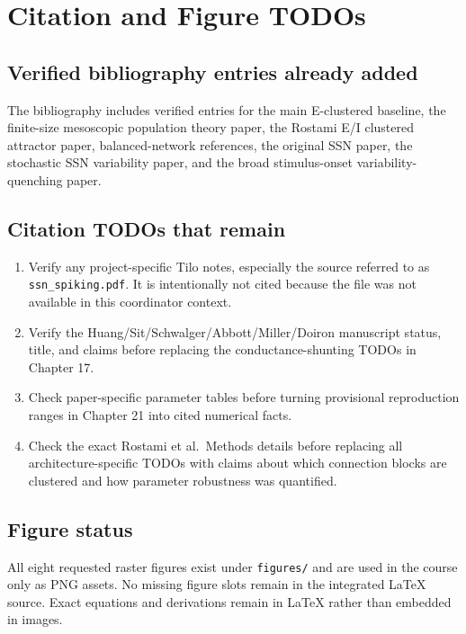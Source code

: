 \chapter*{Citation and Figure TODOs}

\section*{Verified bibliography entries already added}

The bibliography includes verified entries for the main E-clustered baseline, the finite-size mesoscopic population theory paper, the Rostami E/I clustered attractor paper, balanced-network references, the original SSN paper, the stochastic SSN variability paper, and the broad stimulus-onset variability-quenching paper.

\section*{Citation TODOs that remain}

\begin{enumerate}[leftmargin=*]
  \item Verify any project-specific Tilo notes, especially the source referred to as \texttt{ssn\_spiking.pdf}. It is intentionally not cited because the file was not available in this coordinator context.
  \item Verify the Huang/Sit/Schwalger/Abbott/Miller/Doiron manuscript status, title, and claims before replacing the conductance-shunting TODOs in Chapter 17.
  \item Check paper-specific parameter tables before turning provisional reproduction ranges in Chapter 21 into cited numerical facts.
  \item Check the exact Rostami et al.\ Methods details before replacing all architecture-specific TODOs with claims about which connection blocks are clustered and how parameter robustness was quantified.
\end{enumerate}

\section*{Figure status}

All eight requested raster figures exist under \texttt{figures/} and are used in the course only as PNG assets. No missing figure slots remain in the integrated \LaTeX{} source. Exact equations and derivations remain in \LaTeX{} rather than embedded in images.
